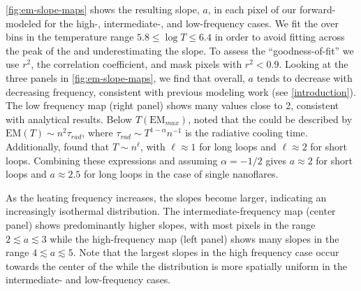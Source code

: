 \autoref{fig:em-slope-maps} shows the resulting \dem{} slope, $a$, in each pixel of our forward-modeled \AR{} for the high-, intermediate-, and low-frequency cases. We fit the \dem{} over bins in the temperature range $5.8\le\log T\le6.4$ in order to avoid fitting across the peak of the \dem{} and underestimating the slope. To assess the ``goodness-of-fit'' we use $r^2$, the correlation coefficient, and mask pixels with $r^2<0.9$. Looking at the three panels in \autoref{fig:em-slope-maps}, we find that overall, $a$ tends to decrease with decreasing frequency, consistent with previous modeling work (see \autoref{introduction}). The low frequency map (right panel) shows many values close to 2, consistent with analytical results. Below $T(\mathrm{EM}_{max})$, \citet{cargill_implications_1994} noted that the \dem{} could be described by $\mathrm{EM}(T)\sim n^2\tau_{rad}$, where $\tau_{rad}\sim T^{1-\alpha}n^{-1}$ is the radiative cooling time. Additionally, \citet{bradshaw_cooling_2010} found that $T\sim n^{\ell}$, with $\ell\approx1$ for long loops and $\ell\approx2$ for short loops. Combining these expressions and assuming $\alpha=-1/2$ \citep[i.e. using the radiative losses of][]{rosner_dynamics_1978} gives $a\approx2$ for short loops and $a\approx2.5$ for long loops in the case of single nanoflares. 

As the heating frequency increases, the slopes become larger, indicating an increasingly isothermal \dem{} distribution. The intermediate-frequency map (center panel) shows predominantly higher slopes, with most pixels in the range $2\lesssim a \lesssim 3$ while the high-frequency map (left panel) shows many slopes in the range $4\lesssim a\lesssim5$. Note that the largest slopes in the high frequency case occur towards the center of the \AR{} while the distribution is more spatially uniform in the intermediate- and low-frequency cases.

